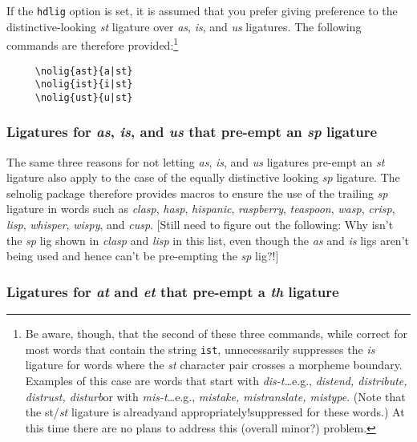 \documentclass[12pt]{article}
\newcommand{\pkg}[1]{\textsf{#1}}
\newcommand{\opt}[1]{\texttt{#1}}
\begin{document}
If the \opt{hdlig} option is set, it is assumed that you prefer giving preference to the distinctive-looking \emph{st} ligature over \emph{as}, \emph{is}, and \emph{us} ligatures. The following commands are therefore provided:\footnote{Be aware, though, that the second of these three commands, while correct for most words that contain the string \opt{ist}, unnecessarily suppresses the \emph{is} ligature for words where the \emph{st} character pair crosses a morpheme boundary. Examples of this case are words that start with \emph{dis-t\ldots}\textemdash e.g., \emph{distend, distribute, distrust, disturb}\textemdash or with \emph{mis-t\ldots}\textemdash e.g., \emph{mistake, mistranslate, mistype}. (Note that the st/\emph{st} ligature is already\textemdash and appropriately!\textemdash suppressed for these words.) At this time there are no plans to address this (overall minor?) problem.}
\begin{Verbatim}
     \nolig{ast}{a|st}
     \nolig{ist}{i|st}
     \nolig{ust}{u|st}
\end{Verbatim}



\subsubsection{Ligatures for \emph{as}, \emph{is}, and \emph{us} that pre-empt an \emph{sp} ligature}

The same three reasons for not letting \emph{as}, \emph{is}, and \emph{us} ligatures pre-empt an \emph{st} ligature also apply to the case of the equally distinctive looking \emph{sp} ligature. The \pkg{selnolig} package therefore provides macros to ensure the use of the trailing \emph{sp} ligature in words such as \emph{clasp}, \emph{hasp}, \emph{hispanic}, \emph{raspberry}, \emph{teaspoon}, \emph{wasp}, \emph{crisp}, \emph{lisp}, \emph{whisper}, \emph{wispy}, and \emph{cusp}. 
[Still need to figure out the following: Why isn't the \emph{sp} lig shown in \emph{clasp} and \emph{lisp} in this list, even though the \emph{as} and \emph{is} ligs aren't being used and hence can't be pre-empting the \emph{sp} lig?!]



\subsubsection{Ligatures for \emph{at} and \emph{et} that pre-empt a \emph{th} ligature}
\end{document}
